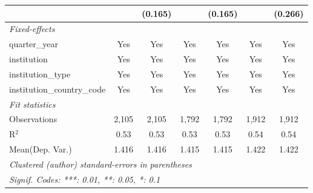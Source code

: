 \begin{tabular}{lcccccc}
                                      &              & (0.165) &              & (0.165)     &             & (0.266)\\   
   \midrule
   \emph{Fixed-effects}\\
   quarter\_year                      & Yes          & Yes     & Yes          & Yes         & Yes         & Yes\\  
   institution                        & Yes          & Yes     & Yes          & Yes         & Yes         & Yes\\  
   institution\_type                  & Yes          & Yes     & Yes          & Yes         & Yes         & Yes\\  
   institution\_country\_code         & Yes          & Yes     & Yes          & Yes         & Yes         & Yes\\  
   \midrule
   \emph{Fit statistics}\\
   Observations                       & 2,105        & 2,105   & 1,792        & 1,792       & 1,912       & 1,912\\  
   R$^2$                              & 0.53         & 0.53    & 0.53         & 0.53        & 0.54        & 0.54\\  
Mean(Dep. Var.) & 1.416 & 1.416 & 1.415 & 1.415 & 1.422 & 1.422 \\
   \midrule \midrule
   \multicolumn{7}{l}{\emph{Clustered (author) standard-errors in parentheses}}\\
   \multicolumn{7}{l}{\emph{Signif. Codes: ***: 0.01, **: 0.05, *: 0.1}}\\
\end{tabular}
\par\endgroup
